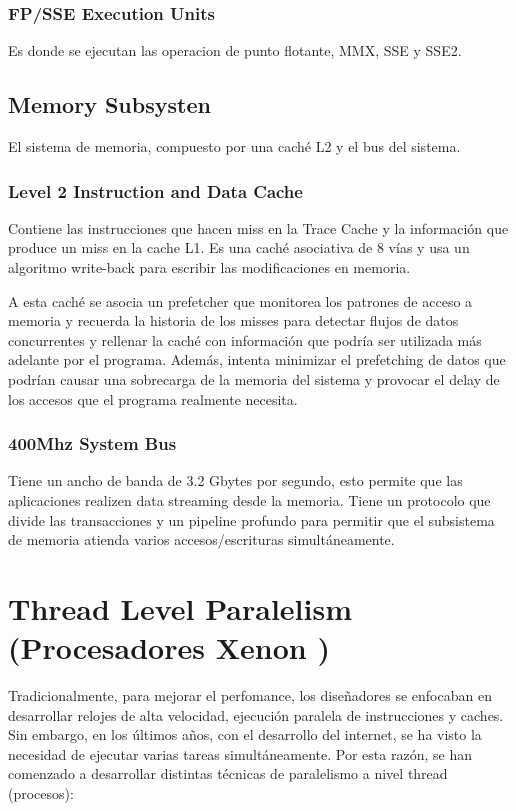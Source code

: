 \subsubsection*{FP/SSE Execution Units}
Es donde se ejecutan las operacion de punto flotante, MMX, SSE y SSE2.
\subsection{Memory Subsysten}
El sistema de memoria, compuesto por una caché L2 y el bus del sistema.

\subsubsection*{Level 2 Instruction and Data Cache}
Contiene las instrucciones que hacen miss en la Trace Cache y la información que produce un miss en la cache L1. Es una caché asociativa de 8 vías y usa un algoritmo write-back para escribir las modificaciones en memoria.

A esta caché se asocia un prefetcher que monitorea los patrones de acceso a memoria y recuerda la historia de los misses para detectar flujos de datos concurrentes y rellenar la caché con información que podría ser utilizada más adelante por el programa. Además, intenta minimizar el prefetching de datos que podrían causar una sobrecarga de la memoria del sistema y provocar el delay de los accesos que el programa realmente necesita.

\subsubsection*{400Mhz System Bus}
Tiene un ancho de banda de 3.2 Gbytes por segundo, esto permite que las aplicaciones realizen data streaming desde la memoria. Tiene un protocolo que divide las transacciones y un pipeline profundo para permitir que el subsistema de memoria atienda varios accesos/escrituras simultáneamente. 

\newpage
\section{Thread Level Paralelism (Procesadores Xenon \cite{marr02threads})}

Tradicionalmente, para mejorar el perfomance, los diseñadores se enfocaban en desarrollar relojes de alta velocidad, ejecución paralela de instrucciones y caches. Sin embargo, en los últimos años, con el desarrollo del internet, se ha visto la necesidad de ejecutar varias tareas simultáneamente. Por esta razón, se han comenzado a desarrollar distintas técnicas de paralelismo a nivel thread (procesos):

